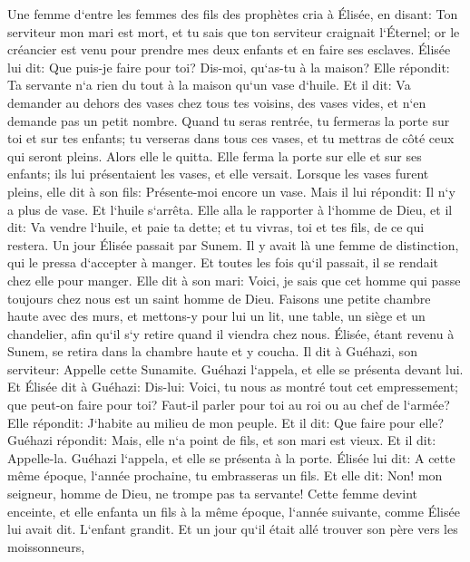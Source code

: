 \verse Une femme d`entre les femmes des fils des prophètes cria à Élisée, en disant: Ton serviteur mon mari est mort, et tu sais que ton serviteur craignait l`Éternel; or le créancier est venu pour prendre mes deux enfants et en faire ses esclaves. 
\verse Élisée lui dit: Que puis-je faire pour toi? Dis-moi, qu`as-tu à la maison? Elle répondit: Ta servante n`a rien du tout à la maison qu`un vase d`huile. 
\verse Et il dit: Va demander au dehors des vases chez tous tes voisins, des vases vides, et n`en demande pas un petit nombre. 
\verse Quand tu seras rentrée, tu fermeras la porte sur toi et sur tes enfants; tu verseras dans tous ces vases, et tu mettras de côté ceux qui seront pleins. 
\verse Alors elle le quitta. Elle ferma la porte sur elle et sur ses enfants; ils lui présentaient les vases, et elle versait. 
\verse Lorsque les vases furent pleins, elle dit à son fils: Présente-moi encore un vase. Mais il lui répondit: Il n`y a plus de vase. Et l`huile s`arrêta. 
\verse Elle alla le rapporter à l`homme de Dieu, et il dit: Va vendre l`huile, et paie ta dette; et tu vivras, toi et tes fils, de ce qui restera. 
\verse Un jour Élisée passait par Sunem. Il y avait là une femme de distinction, qui le pressa d`accepter à manger. Et toutes les fois qu`il passait, il se rendait chez elle pour manger. 
\verse Elle dit à son mari: Voici, je sais que cet homme qui passe toujours chez nous est un saint homme de Dieu. 
\verse Faisons une petite chambre haute avec des murs, et mettons-y pour lui un lit, une table, un siège et un chandelier, afin qu`il s`y retire quand il viendra chez nous. 
\verse Élisée, étant revenu à Sunem, se retira dans la chambre haute et y coucha. 
\verse Il dit à Guéhazi, son serviteur: Appelle cette Sunamite. Guéhazi l`appela, et elle se présenta devant lui. 
\verse Et Élisée dit à Guéhazi: Dis-lui: Voici, tu nous as montré tout cet empressement; que peut-on faire pour toi? Faut-il parler pour toi au roi ou au chef de l`armée? Elle répondit: J`habite au milieu de mon peuple. 
\verse Et il dit: Que faire pour elle? Guéhazi répondit: Mais, elle n`a point de fils, et son mari est vieux. 
\verse Et il dit: Appelle-la. Guéhazi l`appela, et elle se présenta à la porte. 
\verse Élisée lui dit: A cette même époque, l`année prochaine, tu embrasseras un fils. Et elle dit: Non! mon seigneur, homme de Dieu, ne trompe pas ta servante! 
\verse Cette femme devint enceinte, et elle enfanta un fils à la même époque, l`année suivante, comme Élisée lui avait dit. 
\verse L`enfant grandit. Et un jour qu`il était allé trouver son père vers les moissonneurs, 
